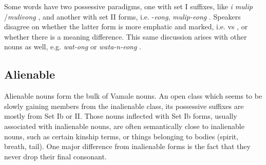 Some words have two possessive paradigms, one with set I suffixes, like \textit{i mulip} \slash \textit{mulivong} , and another with set II forms, i.e. -\textit{eong}, \textit{mulip-eong} . Speakers disagree on whether the latter form is more emphatic and marked, i.e.  vs , or whether there is a meaning difference. This same discussion arises with other nouns as well, e.g. \textit{wat-ong} or \textit{wata-n-eong} .





\subsection{Alienable}
\label{ssec:AlPoss}

Alienable nouns form the bulk of Vamale nouns. An open class which seems to be slowly gaining members from the inalienable class, its possessive suffixes are mostly from Set Ib or II. Those nouns inflected with Set Ib forms, usually associated with inalienable nouns, are often semantically close to inalienable nouns, such as certain kinship terms, or things belonging to bodies (spirit, breath, tail). One major difference from inalienable forms is the fact that they never drop their final consonant. 

%
%
%
%
%

